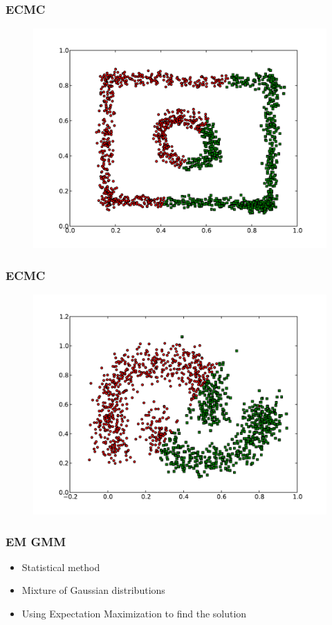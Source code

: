 \documentclass{beamer}
\begin{document}
\begin{frame}
\frametitle{ECMC}
    \begin{figure}[]
    \includegraphics[scale=0.3]{ECMC_circle-weird.pdf}
    \end{figure}
\end{frame}

\begin{frame}
\frametitle{ECMC}
    \begin{figure}[]
    \includegraphics[scale=0.3]{ECMC_half-moons.pdf}
    \end{figure}
\end{frame}



\begin{frame}
\frametitle{EM GMM}
    \begin{itemize}
    	\item Statistical method
   	\item Mixture of Gaussian distributions
   	\item Using Expectation Maximization to find the solution
    \end{itemize}
\end{frame}
\end{document}
